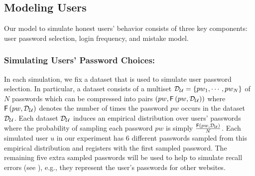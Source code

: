 

\subsection{Modeling Users} \label{section:ExperimentDesign-subsection:SimulateUser}

Our model to simulate honest users' behavior consists of three key components: user password selection, login frequency, and mistake model. 





\subsubsection{Simulating Users’ Password Choices:}\label{section:ExperimentDesign-subsection:SimulateUser-subsubsection:SimulatePasswordChoice}

In each simulation, we fix a dataset that is used to simulate user password selection. In particular, a dataset consists of a multiset $\mathcal{D}_{{\mathcal{U}}} = \{pw_1,\cdots,pw_N\}$ of $N$ passwords which can be compressed into pairs $(pw,  \mathsf{F}\left(pw, \mathcal{D}_{{\mathcal{U}}} \right))$ where $\mathsf{F}\left(pw, \mathcal{D}_{{\mathcal{U}}} \right)$ denotes the number of times the password $pw$ occurs in the dataset $\mathcal{D}_{{\mathcal{U}}}$. Each dataset $\mathcal{D}_{{\mathcal{U}}} $ induces an empirical distribution over users’ passwords where the probability of sampling each password $pw$ is simply $\frac{\mathsf{F}\left(pw, \mathcal{D}_{{\mathcal{U}}}\right)}{N}$. Each simulated user $u$ in our experiment has 6 different passwords sampled from this empirical distribution and registers with the first sampled password. The remaining five extra sampled passwords will be used to help to simulate recall errors (see ), e.g., they represent the user's passwords for other websites. 





